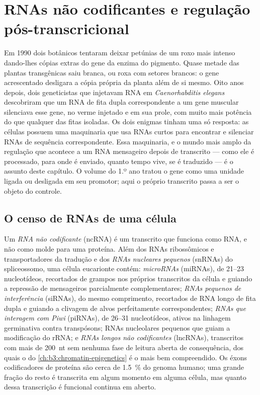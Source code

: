 \chapter{RNAs não codificantes e regulação pós-transcricional}\label{ch:b3:rna-regulation}

Em 1990 dois botânicos tentaram deixar petúnias de um roxo mais
intenso dando-lhes cópias extras do gene da enzima do pigmento. Quase
metade das plantas transgênicas saiu branca, ou roxa com setores
brancos: o gene acrescentado desligara a cópia própria da planta além
de si mesmo. Oito anos depois, dois geneticistas que injetavam RNA em
\emph{Caenorhabditis elegans} descobriram que um RNA de fita dupla
correspondente a um gene muscular silenciava esse gene, no verme
injetado e em sua prole, com muito mais potência do que qualquer das
fitas isoladas. Os dois enigmas tinham uma só resposta: as células
possuem uma maquinaria que usa RNAs curtos para encontrar e silenciar
RNAs de sequência correspondente. Essa maquinaria, e o mundo mais
amplo da regulação que acontece a um RNA mensageiro depois de
transcrito --- como ele é processado, para onde é enviado, quanto
tempo vive, se é traduzido --- é o assunto deste capítulo. O volume do
1.º ano tratou o gene como uma unidade ligada ou desligada em seu
promotor; aqui o próprio transcrito passa a ser o objeto do controle.

\section{O censo de RNAs de uma célula}

\begin{definition}\label{def:b3:rna-regulation:ncrna}
Um \emph{RNA não codificante} (ncRNA) é um transcrito que funciona
como RNA, e não como molde para uma proteína. Além dos RNAs
ribossômicos e transportadores da tradução e dos \emph{RNAs nucleares
pequenos} (snRNAs) do spliceossomo, uma célula eucarionte contém:
\emph{microRNAs} (miRNAs), de \numrange{21}{23} nucleotídeos,
recortados de grampos nos próprios transcritos da célula e guiando a
repressão de mensageiros parcialmente complementares; \emph{RNAs
pequenos de interferência} (siRNAs), do mesmo comprimento, recortados
de RNA longo de fita dupla e guiando a clivagem de alvos perfeitamente
correspondentes; \emph{RNAs que interagem com Piwi} (piRNAs), de
\numrange{26}{31} nucleotídeos, ativos na linhagem germinativa contra
transpósons; RNAs nucleolares pequenos que guiam a modificação do
rRNA; e \emph{RNAs longos não codificantes} (lncRNAs), transcritos com
mais de \qty{200}{nt} sem nenhuma fase de leitura aberta de
consequência, dos quais o \emph{} do
\cref{ch:b3:chromatin-epigenetics} é o mais bem compreendido. Os éxons
codificadores de proteína são cerca de \qty{1.5}{\%} do genoma humano;
uma grande fração do resto é transcrita em algum momento em alguma
célula, mas quanto dessa transcrição é funcional continua em aberto.
\end{definition}

